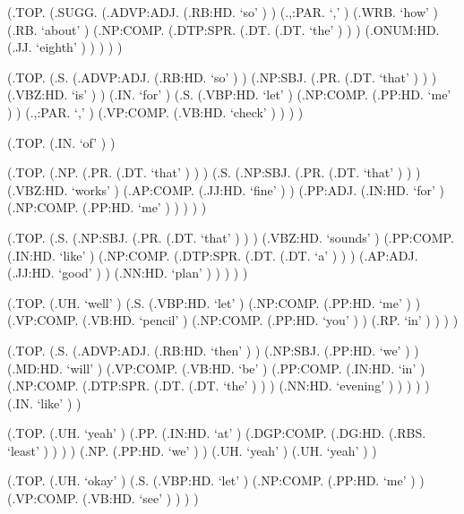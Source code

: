\documentclass[10pt]{article}
\begin{document}
\begin{parsetree}  (.TOP. (.SUGG. (.ADVP:ADJ. (.RB:HD. `so' ) ) (.,:PAR. `,' ) (.WRB. `how' ) (.RB. `about' ) (.NP:COMP. (.DTP:SPR. (.DT. (.DT. `the' ) ) ) (.ONUM:HD. (.JJ. `eighth' ) ) ) ) ) \end{parsetree}

\begin{parsetree}  (.TOP. (.S. (.ADVP:ADJ. (.RB:HD. `so' ) ) (.NP:SBJ. (.PR. (.DT. `that' ) ) ) (.VBZ:HD. `is' ) ) (.IN. `for' ) (.S. (.VBP:HD. `let' ) (.NP:COMP. (.PP:HD. `me' ) ) (.,:PAR. `,' ) (.VP:COMP. (.VB:HD. `check' ) ) ) ) \end{parsetree}

\begin{parsetree}  (.TOP. (.IN. `of' ) ) \end{parsetree}

\begin{parsetree}  (.TOP. (.NP. (.PR. (.DT. `that' ) ) ) (.S. (.NP:SBJ. (.PR. (.DT. `that' ) ) ) (.VBZ:HD. `works' ) (.AP:COMP. (.JJ:HD. `fine' ) ) (.PP:ADJ. (.IN:HD. `for' ) (.NP:COMP. (.PP:HD. `me' ) ) ) ) ) \end{parsetree}

\begin{parsetree}  (.TOP. (.S. (.NP:SBJ. (.PR. (.DT. `that' ) ) ) (.VBZ:HD. `sounds' ) (.PP:COMP. (.IN:HD. `like' ) (.NP:COMP. (.DTP:SPR. (.DT. (.DT. `a' ) ) ) (.AP:ADJ. (.JJ:HD. `good' ) ) (.NN:HD. `plan' ) ) ) ) ) \end{parsetree}

\begin{parsetree}  (.TOP. (.UH. `well' ) (.S. (.VBP:HD. `let' ) (.NP:COMP. (.PP:HD. `me' ) ) (.VP:COMP. (.VB:HD. `pencil' ) (.NP:COMP. (.PP:HD. `you' ) ) (.RP. `in' ) ) ) ) \end{parsetree}

\begin{parsetree}  (.TOP. (.S. (.ADVP:ADJ. (.RB:HD. `then' ) ) (.NP:SBJ. (.PP:HD. `we' ) ) (.MD:HD. `will' ) (.VP:COMP. (.VB:HD. `be' ) (.PP:COMP. (.IN:HD. `in' ) (.NP:COMP. (.DTP:SPR. (.DT. (.DT. `the' ) ) ) (.NN:HD. `evening' ) ) ) ) ) (.IN. `like' ) ) \end{parsetree}

\begin{parsetree}  (.TOP. (.UH. `yeah' ) (.PP. (.IN:HD. `at' ) (.DGP:COMP. (.DG:HD. (.RBS. `least' ) ) ) ) (.NP. (.PP:HD. `we' ) ) (.UH. `yeah' ) (.UH. `yeah' ) ) \end{parsetree}

\begin{parsetree}  (.TOP. (.UH. `okay' ) (.S. (.VBP:HD. `let' ) (.NP:COMP. (.PP:HD. `me' ) ) (.VP:COMP. (.VB:HD. `see' ) ) ) ) \end{parsetree}
\end{document}
